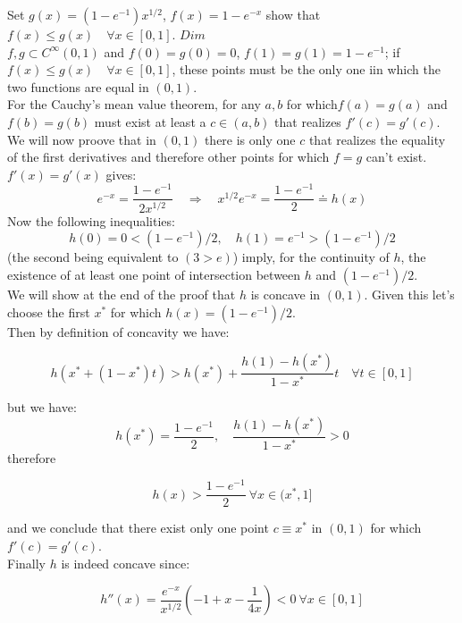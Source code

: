 \documentclass[10pt,a4paper]{report}
\author{D. Doimo}
\begin{document}
Set $g(x)=(1-e^{-1})x^{1/2}$, $f(x)=1-e^{-x}$ show that $f(x) \leq g(x) \quad \forall x\in[0,1]$.\vspace{5mm}
$Dim$\\
$f,g \subset C^{\infty}(0,1)$ and $f(0)=g(0)=0$,  $f(1)=g(1)=1-e^{-1}$; if $f(x) \leq g(x) \quad \forall x\in[0,1]$, these points must be the only one iin which the two functions are equal in $(0,1)$. \\
For the Cauchy's mean value theorem, for any ${a,b}$ for which$f(a)=g(a)$ and $f(b)=g(b)$ must exist at least a $c\in(a,b)$ that realizes $f'(c)=g'(c)$. We will now proove that in $(0,1)$ there is only one $c$ that realizes the equality of the first derivatives and therefore other points for which $f=g$ can't exist.\\
$f'(x)=g'(x)$ gives:
\begin{equation}
e^{-x}=\dfrac{1-e^{-1}}{2x^{1/2}}\quad \Rightarrow \quad x^{1/2}e^{-x}=\dfrac{1-e^{-1}}{2}\doteq h(x)
\end{equation}
Now the following inequalities:
\begin{equation}
h(0)=0<(1-e^{-1})/2, \quad h(1)=e^{-1}>(1-e^{-1})/2
\end{equation}
(the second being equivalent to $(3>e)$) imply, for the continuity of $h$, the existence of at least one point of intersection between $h$ and $(1-e^{-1})/2$.\\
We will show at the end of the proof that $h$ is concave in $(0,1)$. Given this let's choose the first $x^{*}$ for which $h(x)=(1-e^{-1})/2$. \\
Then by definition of concavity we have:

\begin{equation}
h(x^{*}+(1-x^{*})t)> h(x^{*})+\dfrac{h(1)-h(x^{*})}{1-x^{*}}t \quad \forall t \in [0,1]
\end{equation}

but we have:
\begin{equation}
h(x^{*})=\dfrac{1-e^{-1}}{2}, \quad \dfrac{h(1)-h(x^{*})}{1-x^{*}}>0
\end{equation}
therefore

\begin{equation}
h(x)>\dfrac{1-e^{-1}}{2} \ \forall x \in(x^{*},1]
\end{equation}

and we conclude that there exist only one point $c\equiv x^{*}$ in $(0,1)$ for which $f'(c)=g'(c)$.\\
Finally $h$ is indeed concave since:

\begin{equation}
h''(x)=\dfrac{e^{-x}}{x^{1/2}}\left(-1+x-\dfrac{1}{4x}\right)<0 \ \forall x\in[0,1]
\end{equation}
\end{document}
